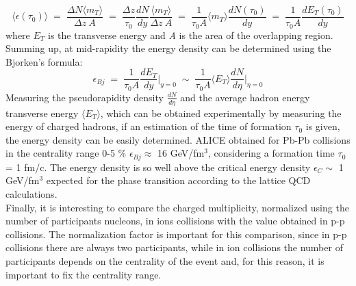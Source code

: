 \begin{equation}
 \langle \epsilon(\tau_{0}) \rangle \; = \; \frac{\Delta N\langle m_{T}\rangle}{\Delta z\:A}\;=\;\frac{\Delta z}{\tau_{0}}\frac{dN}{dy}\frac{\langle m_{T}\rangle}{\Delta z\:A}\;=\;\frac{1}{\tau_{0} A} \langle m_{T} \rangle \frac{dN(\tau_{0})}{dy}\;=\;\frac{1}{\tau_{0} A}\frac{dE_{T}(\tau_{0})}{dy}
\end{equation}
where $E_{T}$ is the transverse energy and \textit{A} is the area of the overlapping region.\\
Summing up, at mid-rapidity the energy density can be determined using the Bjorken's formula:
\begin{equation}
 \epsilon_{Bj}\;=\; \frac{1}{\tau_{0} A}\frac{dE_{T}}{dy}\Big|_{y=0}\;\sim\;\frac{1}{\tau_{0} A}\langle E_{T} \rangle \frac{dN}{d\eta}\Big|_{\eta=0}
\end{equation}
Measuring the pseudorapidity density $\frac{dN}{d\eta}$ and the average hadron energy transverse energy $\langle E_{T} \rangle$, which can be obtained experimentally by measuring the energy of charged hadrons, if an estimation of the time of formation $\tau_{0}$ is given, the energy density can be easily determined. ALICE obtained for Pb-Pb collisions in the centrality range 0-5 \% $\epsilon_{Bj} \approx$ 16 GeV/fm$^{3}$, considering a formation time $\tau_{0}$ = 1 fm/c. The energy density is so well above the critical energy density $\epsilon_{C} \sim$ 1 GeV/fm$^{3}$ expected for the phase transition according to the lattice QCD calculations.\\
Finally, it is interesting to compare the charged multiplicity, normalized using the number of participants nucleons, in ions collisions with the value obtained in p-p collisions. The normalization factor is important for this comparison, since in p-p collisions there are always two participants, while in ion collisions the number of participants depends on the centrality of the event and, for this reason, it is important to fix the centrality range.
%
